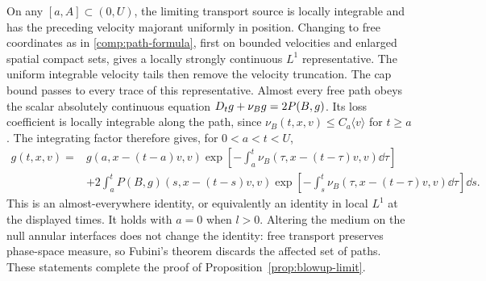On any \([a,A]\subset(0,U)\), the limiting transport source is
locally integrable and has the preceding velocity majorant uniformly
in position. Changing to free coordinates as in
\eqref{comp:path-formula}, first on bounded velocities and enlarged
spatial compact sets, gives a locally strongly continuous \(L^1\)
representative. The uniform integrable velocity tails then remove the
velocity truncation. The cap bound passes to every trace of this
representative. Almost every free path obeys the scalar absolutely
continuous equation
\(D_t g+\nu_Bg=2P(B,g)\). Its loss coefficient is locally integrable
along the path, since
\(\nu_B(t,x,v)\leq C_a\langle v\rangle\) for \(t\geq a\).
The integrating factor therefore gives, for \(0<a<t<U\),
\begin{equation}\label{dil:mild}
\begin{split}
g(t,x,v)={}&g(a,x-(t-a)v,v)
 \exp\left[-\int_a^t\nu_B(\tau,x-(t-\tau)v,v)\dd\tau\right]\\
&+2\int_a^t P(B,g)(s,x-(t-s)v,v)
 \exp\left[-\int_s^t\nu_B(\tau,x-(t-\tau)v,v)\dd\tau\right]\dd s.
\end{split}
\end{equation}
This is an almost-everywhere identity, or equivalently an identity in
local \(L^1\) at the displayed times. It holds with \(a=0\) when
\(l>0\). Altering the medium on the null annular interfaces does not
change the identity: free transport preserves phase-space measure, so
Fubini's theorem discards the affected set of paths. These statements
complete the proof of Proposition~\ref{prop:blowup-limit}.
